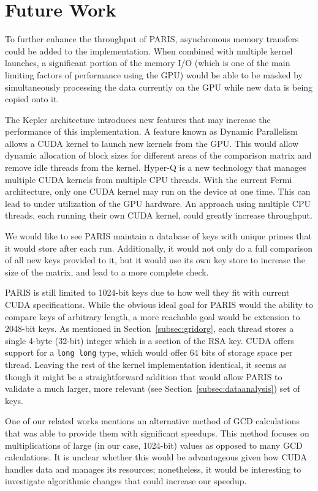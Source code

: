 \documentclass[smallextended]{svjour3}       %
\begin{document}
\section{Future Work}
\label{sec:future}
To further enhance the throughput of PARIS, asynchronous memory transfers could
be added to the implementation. When combined with multiple kernel launches, a
significant portion of the memory I/O (which is one of the main limiting
factors of performance using the GPU) would be able to be masked by
simultaneously processing the data currently on the GPU while new data is being
copied onto it.

The Kepler architecture introduces new features that may increase the 
performance of this implementation. A feature known as Dynamic Parallelism 
allows a CUDA kernel to launch new kernels from the GPU. This would allow
dynamic allocation of block sizes for different areas of the comparison matrix
and remove idle threads from the kernel. Hyper-Q is a new technology that
manages multiple CUDA kernels from multiple CPU threads. With the current Fermi
architecture, only one CUDA kernel may run on the device at one time. This can
lead to under utilization of the GPU hardware. An approach using multiple CPU
threads, each running their own CUDA kernel, could greatly increase throughput.

We would like to see PARIS maintain a database of keys with unique primes that
it would store after each run. Additionally, it would not only do a full
comparison of all new keys provided to it, but it would use its own key store
to increase the size of the matrix, and lead to a more complete check.

PARIS is still limited to 1024-bit keys due to how well they fit with current
CUDA specifications. While the obvious ideal goal for PARIS would the ability 
to compare keys of arbitrary length, a more reachable goal would be extension
to 2048-bit keys. As mentioned in Section~\ref{subsec:gridorg}, each thread
stores a single 4-byte (32-bit) integer which is a section of the RSA key. CUDA
offers support for a \texttt{long long} type, which would offer 64 bits of
storage space per thread. Leaving the rest of the kernel implementation
identical, it seems as though it might be a straightforward addition that would
allow PARIS to validate a much larger, more relevant (see
Section~\ref{subsec:dataanalysis}) set of keys.

One of our related works \cite{heninger2012mining} mentions an alternative
method of GCD calculations that was able to provide them with significant
speedups. This method focuses on multiplications of large (in our case,
1024-bit) values as opposed to many GCD calculations. It is unclear whether
this would be advantageous given how CUDA handles data and manages its
resources; nonetheless, it would be interesting to investigate algorithmic
changes that could increase our speedup.
\end{document}

